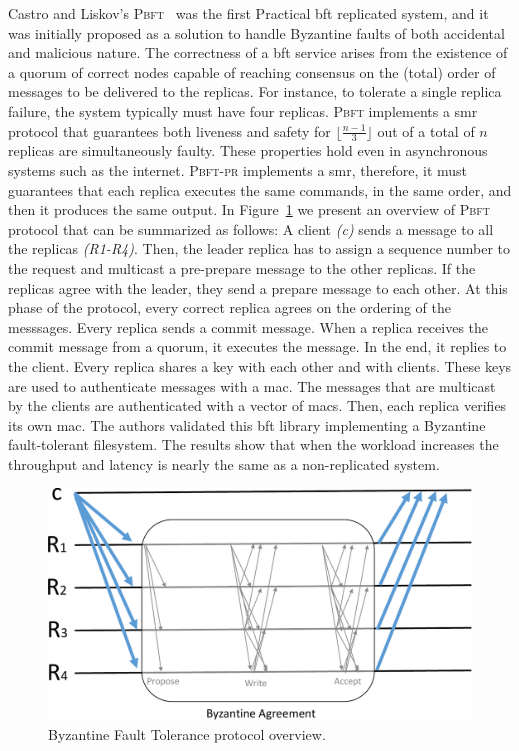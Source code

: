 Castro and Liskov’s \textsc{Pbft}~\cite{Castro:1999} was the first Practical \gls{bft} replicated system, and it was initially proposed as a solution to handle Byzantine faults of both accidental and malicious nature.
The correctness of a \gls{bft} service arises from the existence of a quorum of correct nodes capable of reaching consensus on the (total) order of messages to be delivered to the replicas.
For instance, to tolerate a single replica failure, the system typically must have four replicas. 
\textsc{Pbft} implements a \gls{smr} protocol that guarantees both liveness and safety for $\lfloor\frac{n-1}{3}\rfloor$ out of a total of $n$ replicas are simultaneously faulty. 
These properties hold even in asynchronous systems such as the internet. 
\textsc{Pbft-pr} implements a \gls{smr}, therefore, it must guarantees that each replica executes the same commands, in the same order, and then it produces the same output. 
In Figure~\ref{fig:bft} we present an overview of \textsc{Pbft} protocol that can be summarized as follows:
A client \emph{(c)} sends a message to all the replicas \emph{(R1-R4)}.
Then, the leader replica has to assign a sequence number to the request and multicast a pre-prepare message to the other replicas. 
If the replicas agree with the leader, they send a prepare message to each other. 
At this phase of the protocol, every correct replica agrees on the ordering of the messsages.  
Every replica sends a commit message. 
When a replica receives the commit message from a quorum, it executes the message. 
In the end, it replies to the client. 
Every replica shares a key with each other and with clients. These keys are used to authenticate messages with a \gls{mac}. 
The messages that are multicast by the clients are authenticated with a vector of \glspl{mac}. 
Then, each replica verifies its own \gls{mac}.
The authors validated this \gls{bft} library implementing a Byzantine fault-tolerant filesystem. 
The results show that when the workload increases the throughput and latency is nearly the same as a non-replicated system. 

\begin{figure}[h]
\begin{center}
\includegraphics[width=.7\columnwidth]{images/images/bft.pdf}
\caption{Byzantine Fault Tolerance protocol overview.}
\label{fig:bft}
\end{center}
\end{figure}


